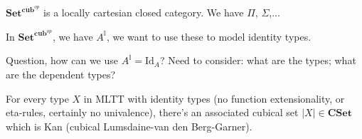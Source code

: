 \documentclass{article}
\newcommand{\ccub}{\mathbf{cub}}
\newcommand{\cSet}{\mathbf{Set}^{\ccub^{op}}}
\begin{document}
$\cSet$ is a locally cartesian closed category. We have $\Pi$, $\Sigma$,...

In $\cSet$, we have $A^\mathbb{I}$, we want to use these to model identity
types.

Question, how can we use $A^\mathbb{I}=\mathrm{Id}_A$? Need to consider: what
are the types; what are the dependent types?

\begin{lem}
For every type $X$ in MLTT with identity types (no function extensionality, or
eta-rules, certainly no univalence), there's an associated cubical set
$|X|\in\mathbf{CSet}$ which is Kan (cubical Lumsdaine-van den Berg-Garner).
\end{lem}
\end{document}
